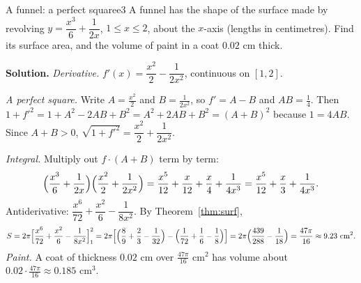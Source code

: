 \documentclass[11pt]{article}
\begin{document}
\begin{exmp}{A funnel: a perfect square}{e3}
A funnel has the shape of the surface made by revolving $y=\dfrac{x^3}6+\dfrac1{2x}$, $1\le x\le2$, about the $x$-axis (lengths in centimetres). Find its surface area, and the volume of paint in a coat $0.02$ cm thick.

\textbf{Solution.} \emph{Derivative.} $f'(x)=\dfrac{x^2}2-\dfrac1{2x^2}$, continuous on $[1,2]$.

\emph{A perfect square.} Write $A=\frac{x^2}2$ and $B=\frac1{2x^2}$, so $f'=A-B$ and $AB=\frac14$. Then $1+f'^2=1+A^2-2AB+B^2=A^2+2AB+B^2=(A+B)^2$ because $1=4AB$. Since $A+B>0$, $\sqrt{1+f'^2}=\dfrac{x^2}2+\dfrac1{2x^2}$.

\emph{Integral.} Multiply out $f\cdot(A+B)$ term by term:
\[
\Bigl(\frac{x^3}6+\frac1{2x}\Bigr)\Bigl(\frac{x^2}2+\frac1{2x^2}\Bigr)=\frac{x^5}{12}+\frac x{12}+\frac x4+\frac1{4x^3}=\frac{x^5}{12}+\frac x3+\frac1{4x^3}.
\]
Antiderivative: $\dfrac{x^6}{72}+\dfrac{x^2}6-\dfrac1{8x^2}$. By Theorem~\ref{thm:surf},
\[
S=2\pi\Bigl[\frac{x^6}{72}+\frac{x^2}6-\frac1{8x^2}\Bigr]_1^2=2\pi\Bigl[\Bigl(\frac89+\frac23-\frac1{32}\Bigr)-\Bigl(\frac1{72}+\frac16-\frac18\Bigr)\Bigr]=2\pi\Bigl(\frac{439}{288}-\frac1{18}\Bigr)=\frac{47\pi}{16}\approx9.23\ \text{cm}^2 .
\]
\emph{Paint.} A coat of thickness $0.02$ cm over $\frac{47\pi}{16}$ cm$^2$ has volume about $0.02\cdot\frac{47\pi}{16}\approx0.185$ cm$^3$.


\end{exmp}
\end{document}

